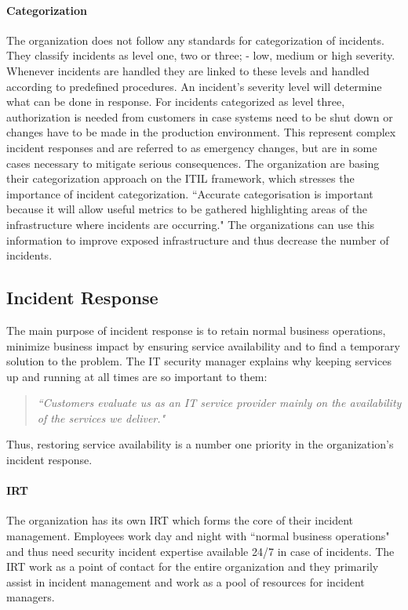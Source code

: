 \paragraph{Categorization}
The organization does not follow any standards for categorization of incidents. They classify incidents as level one, two or three; - low, medium or high severity. Whenever incidents are handled they are linked to these levels and handled according to predefined procedures. An incident's severity level will determine what can be done in response. For incidents categorized as level three, authorization is needed from customers in case systems need to be shut down or changes have to be made in the production environment. This represent complex incident responses and are referred to as emergency changes, but are in some cases necessary to mitigate serious consequences. 
The organization are basing their categorization approach on the ITIL framework, which stresses the importance of incident categorization. ``Accurate categorisation is important because it will allow useful metrics to be gathered highlighting areas of the infrastructure where incidents are occurring\cite{itilbok}." The organizations can use this information to improve exposed infrastructure and thus decrease the number of incidents.
\subsection{Incident Response}
The main purpose of incident response is to retain normal business operations, minimize business impact by ensuring service availability and to find a temporary solution to the problem. The IT security manager explains why keeping services up and running at all times are so important to them:
\begin{quote}
\textit{``Customers evaluate us as an IT service provider mainly on the availability of the services we deliver."}
\end{quote}
Thus, restoring service availability is a number one priority in the organization's incident response.

\paragraph{\acl{IRT}}
The organization has its own \ac{IRT} which forms the core of their incident management. Employees work day and night with ``normal business operations" and thus need security incident expertise available 24/7 in case of incidents. The \ac{IRT} work as a point of contact for the entire organization and they primarily assist in incident management and work as a pool of resources for incident managers. 

